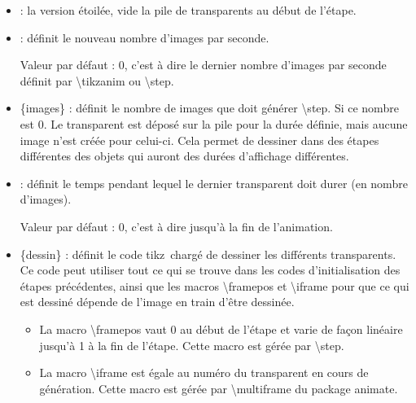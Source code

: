 \documentclass[a4paper,12pt]{article}
\newcommand\Tikz{{\ttfamily tikz}}
\newcommand\Animate{{\ttfamily animate}}
\begin{document}
	\begin{itemize}
		\item {\ttfamily *} : la version étoilée, vide la pile de transparents au début de l'étape.
		\item {\ttfamily[rafraîchissement]} : définit le nouveau nombre d'images par seconde.
		
		Valeur par défaut : 0, c'est à dire le dernier nombre d'images par seconde définit par {\ttfamily\textbackslash tikzanim} ou {\ttfamily\textbackslash step}.
		\item {\ttfamily\{images\}} : définit le nombre de images que doit générer {\ttfamily\textbackslash step}. Si ce nombre est 0. Le transparent est déposé sur la pile pour la durée
		définie, mais aucune image n'est créée pour celui-ci. Cela permet de dessiner dans des étapes différentes des objets qui auront des durées d'affichage différentes.
		
		\item {\ttfamily[durée]} : définit le temps pendant lequel le dernier transparent doit durer (en nombre d'images).
		
		Valeur par défaut : 0, c'est à dire jusqu'à la fin de l'animation.

		\item {\ttfamily\{dessin\}} : définit le code \Tikz\ chargé de dessiner les différents transparents. Ce code peut utiliser tout ce qui se trouve dans
		les codes d'initialisation des étapes précédentes, ainsi que les macros {\ttfamily\textbackslash framepos} et {\ttfamily\textbackslash iframe} pour que 
		ce qui est dessiné dépende de l'image en train d'être dessinée.
		
		\begin{itemize}
			\item La macro {\ttfamily\textbackslash framepos} vaut 0 au  début de l'étape et varie de façon linéaire jusqu'à 1 à la fin de l'étape. Cette macro est gérée par {\ttfamily\textbackslash step}.
			\item La macro {\ttfamily\textbackslash iframe} est égale au numéro du transparent en cours de génération. Cette macro est gérée par {\ttfamily\textbackslash multiframe} du package \Animate.
		\end{itemize}
		
	\end{itemize}
	
\end{document}
